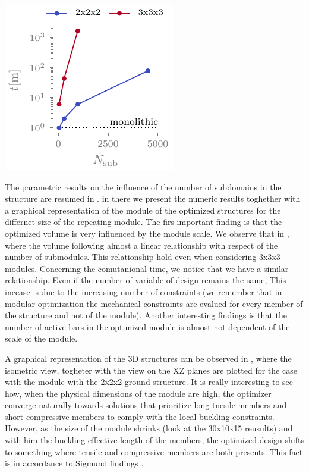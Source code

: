 \begin{marginfigure}
    \centering
    \includegraphics{figures/05_cellular_opt/00_module_scale_tab/scale_tab_t.pdf}
    \caption{}
    \label{fig:05_scale_t}
\end{marginfigure}

The parametric results on the influence of the number of subdomains in the structure are resumed in . in there we present the numeric results toghether with a graphical representation of the module of the optimized structures for the differnet size of the repeating module. The firs important finding is that the optimized volume is very influenced by the module scale. We observe that in , where the volume following almost a linear relationship with respect of the number of submodules. This relationship hold even when considering 3x3x3 modules. Concerning the comutanional time, we notice that we have a similar relationship. Even if the number of variable of design remains the same, This incease is due to the increasing number of constraints (we remember that in modular optimization the mechanical constraints are evalued for every member of the structure and not of the module). Another interesting findings is that the number of active bars in the optimized module is almost not dependent of the scale of the module.

A graphical representation of the 3D structures can be observed in , where the isometric view, togheter with the view on the XZ planes are plotted for the case with the module with the 2x2x2 ground structure. It is really interesting to see how, when the physical dimensions of the module are high, the optimizer converge naturally towards solutions that  prioritize long tnesile members and short compressive members to comply with the local buckling constraints. However, as the size of the module shrinks (look at the 30x10x15 reusults) and with him the buckling effective length of the members, the optimized design shifts to something where tensile and compressive members are both presents. This fact is in accordance to Sigmund findings .

